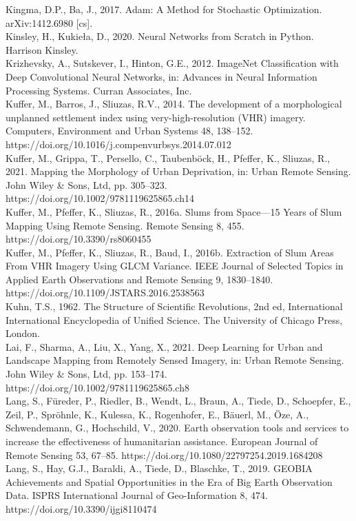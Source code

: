 \documentclass[11pt, a4paper, twoside]{report}
\begin{document}
Kingma, D.P., Ba, J., 2017. Adam: A Method for Stochastic Optimization. arXiv:1412.6980 [cs].\\
Kinsley, H., Kukieła, D., 2020. Neural Networks from Scratch in Python. Harrison Kinsley.\\
Krizhevsky, A., Sutskever, I., Hinton, G.E., 2012. ImageNet Classification with Deep Convolutional Neural Networks, in: Advances in Neural Information Processing Systems. Curran Associates, Inc.\\
Kuffer, M., Barros, J., Sliuzas, R.V., 2014. The development of a morphological unplanned settlement index using very-high-resolution (VHR) imagery. Computers, Environment and Urban Systems 48, 138–152. https://doi.org/10.1016/j.compenvurbsys.2014.07.012\\
Kuffer, M., Grippa, T., Persello, C., Taubenböck, H., Pfeffer, K., Sliuzas, R., 2021. Mapping the Morphology of Urban Deprivation, in: Urban Remote Sensing. John Wiley & Sons, Ltd, pp. 305–323. https://doi.org/10.1002/9781119625865.ch14\\
Kuffer, M., Pfeffer, K., Sliuzas, R., 2016a. Slums from Space—15 Years of Slum Mapping Using Remote Sensing. Remote Sensing 8, 455. https://doi.org/10.3390/rs8060455\\
Kuffer, M., Pfeffer, K., Sliuzas, R., Baud, I., 2016b. Extraction of Slum Areas From VHR Imagery Using GLCM Variance. IEEE Journal of Selected Topics in Applied Earth Observations and Remote Sensing 9, 1830–1840. https://doi.org/10.1109/JSTARS.2016.2538563\\
Kuhn, T.S., 1962. The Structure of Scientific Revolutions, 2nd ed, International International Encyclopedia of Unified Science. The University of Chicago Press, London.\\
Lai, F., Sharma, A., Liu, X., Yang, X., 2021. Deep Learning for Urban and Landscape Mapping from Remotely Sensed Imagery, in: Urban Remote Sensing. John Wiley & Sons, Ltd, pp. 153–174. https://doi.org/10.1002/9781119625865.ch8\\
Lang, S., Füreder, P., Riedler, B., Wendt, L., Braun, A., Tiede, D., Schoepfer, E., Zeil, P., Spröhnle, K., Kulessa, K., Rogenhofer, E., Bäuerl, M., Öze, A., Schwendemann, G., Hochschild, V., 2020. Earth observation tools and services to increase the effectiveness of humanitarian assistance. European Journal of Remote Sensing 53, 67–85. https://doi.org/10.1080/22797254.2019.1684208\\
Lang, S., Hay, G.J., Baraldi, A., Tiede, D., Blaschke, T., 2019. GEOBIA Achievements and Spatial Opportunities in the Era of Big Earth Observation Data. ISPRS International Journal of Geo-Information 8, 474. https://doi.org/10.3390/ijgi8110474\\
\end{document}
